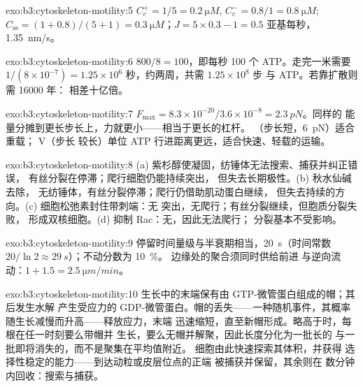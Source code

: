 \begin{solution}{exo:b3:cytoskeleton-motility:5}
$C_{c}^{+} = 1/5 = \qty{0.2}{\micro M}$, $C_{c}^{-} = 0.8/1 =
\qty{0.8}{\micro M}$; $C_{\text{ss}} = (1 + 0.8)/(5 + 1) = \qty{0.3}{\micro
M}$；$J = 5\times 0.3 - 1 = 0.5$ 亚基每秒，\qty{1.35}{nm/s}。
\end{solution}

\begin{solution}{exo:b3:cytoskeleton-motility:6}
$800/8 = 100$，即每秒 100 个 ATP。走完一米需要 $1/(8\times 10^{-7}) =
1.25\times 10^{6}$ 秒，约两周，共需 $1.25\times 10^{8}$ 步
与 ATP。若靠扩散则需 \num{16000} 年：
相差十亿倍。
\end{solution}

\begin{solution}{exo:b3:cytoskeleton-motility:7}
$F_{\max} = 8.3\times 10^{-20}/3.6\times 10^{-8} = \qty{2.3}{pN}$。同样的
能量分摊到更长步长上，力就更小——相当于更长的杠杆。
（步长短，\qty{6}{pN}）适合重载； V（步长
较长）单位 ATP 行进距离更远，适合快速、轻载的运输。
\end{solution}

\begin{solution}{exo:b3:cytoskeleton-motility:8}
(a) 紫杉醇使凝固，纺锤体无法搜索、捕获并纠正错误，
有丝分裂在停滞；爬行细胞仍能持续突出，
但失去长期极性。(b) 秋水仙碱去除，
无纺锤体，有丝分裂停滞；爬行仍借助肌动蛋白继续，
但失去持续的方向。(c) 细胞松弛素封住带刺端：无
突出，无爬行；有丝分裂继续，但胞质分裂失败，
形成双核细胞。(d) 抑制 Rac：无，因此无法爬行；
分裂基本不受影响。
\end{solution}

\begin{solution}{exo:b3:cytoskeleton-motility:9}
停留时间量级与半衰期相当，\qty{20}{s}（时间常数
$20/\ln 2 \approx \qty{29}{s}$）；不动分数为 \qty{10}{\%}。
边缘处的聚合须同时供给前进
与逆向流动：$1 + 1.5 = \qty{2.5}{\micro m/min}$。
\end{solution}

\begin{solution}{exo:b3:cytoskeleton-motility:10}
生长中的末端保有由 GTP-微管蛋白组成的帽；其后发生水解
产生受应力的 GDP-微管蛋白。帽的丢失——一种随机事件，其概率
随生长减慢而升高——释放应力，末端
迅速缩短，直至新帽形成。略高于时，每根在任一时刻要么带帽并
生长，要么无帽并解聚，因此长度分化为一批长的
与一批即将消失的，而不是聚集在平均值附近。
细胞由此快速探索其体积，并获得
选择性稳定的能力——到达动粒或皮层位点的正端
被捕获并保留，其余则在
数分钟内回收：搜索与捕获。
\end{solution}

